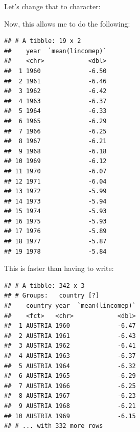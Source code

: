 \documentclass[]{gitbook}
\newenvironment{Shaded}{\begin{snugshade}}{\end{snugshade}}
\newcommand{\DataTypeTok}[1]{\textcolor[rgb]{0.13,0.29,0.53}{#1}}
\newcommand{\KeywordTok}[1]{\textcolor[rgb]{0.13,0.29,0.53}{\textbf{#1}}}
\newcommand{\NormalTok}[1]{#1}
\newcommand{\OperatorTok}[1]{\textcolor[rgb]{0.81,0.36,0.00}{\textbf{#1}}}
\newcommand{\StringTok}[1]{\textcolor[rgb]{0.31,0.60,0.02}{#1}}
\theoremstyle{definition}
\theoremstyle{definition}
\theoremstyle{definition}
\theoremstyle{remark}
\begin{document}
Let's change that to character:

\begin{Shaded}
\end{Shaded}

Now, this allows me to do the following:

\begin{Shaded}
\end{Shaded}

\begin{verbatim}
## # A tibble: 19 x 2
##    year  `mean(lincomep)`
##    <chr>            <dbl>
##  1 1960             -6.50
##  2 1961             -6.46
##  3 1962             -6.42
##  4 1963             -6.37
##  5 1964             -6.33
##  6 1965             -6.29
##  7 1966             -6.25
##  8 1967             -6.21
##  9 1968             -6.18
## 10 1969             -6.12
## 11 1970             -6.07
## 12 1971             -6.04
## 13 1972             -5.99
## 14 1973             -5.94
## 15 1974             -5.93
## 16 1975             -5.93
## 17 1976             -5.89
## 18 1977             -5.87
## 19 1978             -5.84
\end{verbatim}

This is faster than having to write:

\begin{Shaded}
\end{Shaded}

\begin{verbatim}
## # A tibble: 342 x 3
## # Groups:   country [?]
##    country year  `mean(lincomep)`
##    <fct>   <chr>            <dbl>
##  1 AUSTRIA 1960             -6.47
##  2 AUSTRIA 1961             -6.43
##  3 AUSTRIA 1962             -6.41
##  4 AUSTRIA 1963             -6.37
##  5 AUSTRIA 1964             -6.32
##  6 AUSTRIA 1965             -6.29
##  7 AUSTRIA 1966             -6.25
##  8 AUSTRIA 1967             -6.23
##  9 AUSTRIA 1968             -6.21
## 10 AUSTRIA 1969             -6.15
## # ... with 332 more rows
\end{verbatim}
\end{document}
